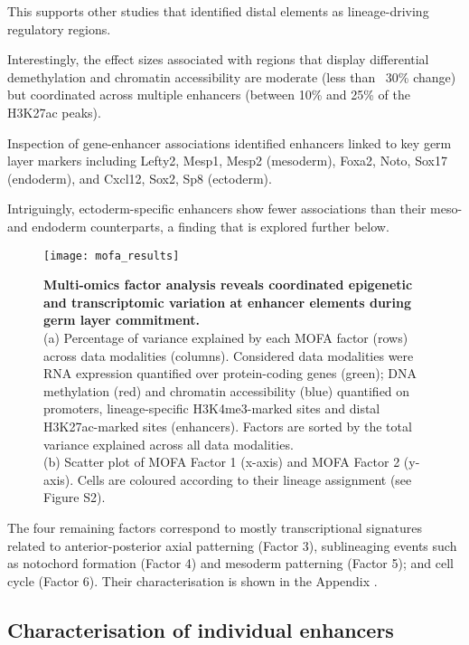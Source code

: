 This supports other studies that identified distal elements as lineage-driving regulatory regions. 

Interestingly, the effect sizes associated with regions that display differential demethylation and chromatin accessibility are moderate (less than ~30\% change) but coordinated across multiple enhancers (between 10\% and 25\% of the H3K27ac peaks). 

Inspection of gene-enhancer associations identified enhancers linked to key germ layer markers including Lefty2, Mesp1, Mesp2 (mesoderm), Foxa2, Noto, Sox17 (endoderm), and Cxcl12, Sox2, Sp8 (ectoderm). 

Intriguingly, ectoderm-specific enhancers show fewer associations than their meso- and endoderm counterparts, a finding that is explored further below.

\begin{figure}[H]
	\centering
	\texttt{[image: mofa\_results]}
	\caption[]{
	\textbf{Multi-omics factor analysis reveals coordinated epigenetic and transcriptomic variation at enhancer elements during germ layer commitment.} \\
	(a) Percentage of variance explained by each MOFA factor (rows) across data modalities (columns). Considered data modalities were RNA expression quantified over protein-coding genes (green); DNA methylation (red) and chromatin accessibility (blue) quantified on promoters,  lineage-specific H3K4me3-marked sites and distal H3K27ac-marked sites (enhancers). Factors are sorted by the total variance explained across all data modalities. \\
	(b) Scatter plot of MOFA Factor 1 (x-axis) and MOFA Factor 2 (y-axis). Cells are coloured according to their lineage assignment (see Figure S2). \\
	}
	\label{fig:mofa_results}
\end{figure}

The four remaining factors correspond to mostly transcriptional signatures related to anterior-posterior axial patterning (Factor 3), sublineaging events such as notochord formation (Factor 4) and mesoderm patterning (Factor 5); and cell cycle (Factor 6). Their characterisation is shown in the Appendix .

\subsection{Characterisation of individual enhancers}

